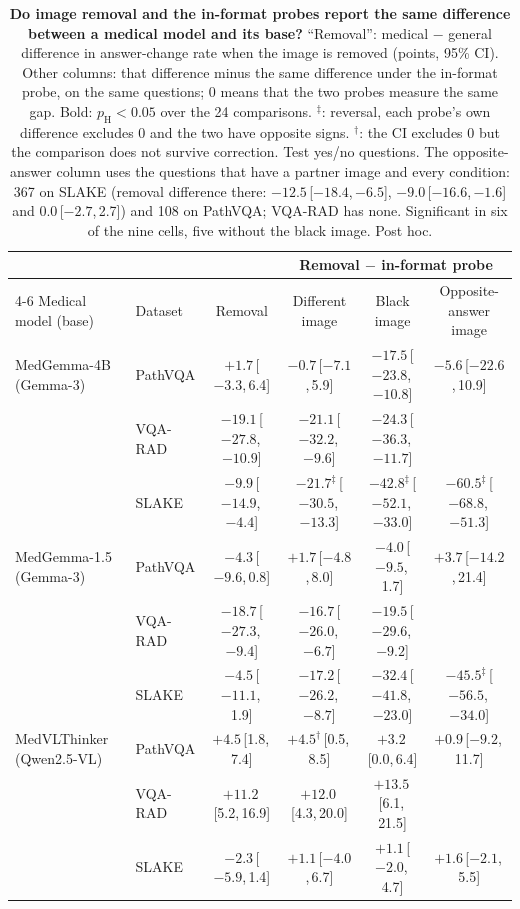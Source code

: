 \documentclass[10pt,twocolumn,letterpaper]{article}
\newcommand{\ci}[2]{\,[#1,\,#2]}  %
\begin{document}
\begin{table}[t]
\centering\footnotesize\setlength{\tabcolsep}{3.5pt}
\caption{\textbf{Do image removal and the in-format probes report the same difference between a medical model and
its base?} ``Removal'': medical $-$ general difference in answer-change rate when the image is removed (points,
95\% CI). Other columns: that difference minus the same difference under the in-format probe, on the same
questions; 0 means that the two probes measure the same gap. Bold: $p_{\text{H}}<0.05$ over the 24
comparisons. $^\ddagger$: reversal, \ie each probe's own difference excludes 0 and the two have opposite signs.
$^\dagger$: the CI excludes 0 but the comparison does not survive correction. Test yes/no questions. The
opposite-answer column uses the questions that have a partner image and every condition: 367 on SLAKE (removal
difference there: $-12.5$\ci{$-18.4$}{$-6.5$}, $-9.0$\ci{$-16.6$}{$-1.6$} and $0.0$\ci{$-2.7$}{2.7}) and 108 on
PathVQA; VQA-RAD has none. Significant in six of the nine cells, five without the black image. Post hoc.}
\label{tab:did}
\begin{tabular}{llcccc}
\toprule
& & & \multicolumn{3}{c}{Removal $-$ in-format probe}\\
\cmidrule(lr){4-6}
Medical model (base) & Dataset & Removal & Different image & Black image & Opposite-answer image\\
\midrule
MedGemma-4B (Gemma-3) & PathVQA & $+1.7$\ci{$-3.3$}{6.4} & $-0.7$\ci{$-7.1$}{5.9} & $\mathbf{-17.5}$\ci{$-23.8$}{$-10.8$} & $-5.6$\ci{$-22.6$}{10.9}\\
& VQA-RAD & $-19.1$\ci{$-27.8$}{$-10.9$} & $\mathbf{-21.1}$\ci{$-32.2$}{$-9.6$} & $\mathbf{-24.3}$\ci{$-36.3$}{$-11.7$} & \\
& SLAKE & $-9.9$\ci{$-14.9$}{$-4.4$} & $\mathbf{-21.7}^\ddagger$\ci{$-30.5$}{$-13.3$} & $\mathbf{-42.8}^\ddagger$\ci{$-52.1$}{$-33.0$} & $\mathbf{-60.5}^\ddagger$\ci{$-68.8$}{$-51.3$}\\
\midrule
MedGemma-1.5 (Gemma-3) & PathVQA & $-4.3$\ci{$-9.6$}{0.8} & $+1.7$\ci{$-4.8$}{8.0} & $-4.0$\ci{$-9.5$}{1.7} & $+3.7$\ci{$-14.2$}{21.4}\\
& VQA-RAD & $-18.7$\ci{$-27.3$}{$-9.4$} & $\mathbf{-16.7}$\ci{$-26.0$}{$-6.7$} & $\mathbf{-19.5}$\ci{$-29.6$}{$-9.2$} & \\
& SLAKE & $-4.5$\ci{$-11.1$}{1.9} & $\mathbf{-17.2}$\ci{$-26.2$}{$-8.7$} & $\mathbf{-32.4}$\ci{$-41.8$}{$-23.0$} & $\mathbf{-45.5}^\ddagger$\ci{$-56.5$}{$-34.0$}\\
\midrule
MedVLThinker (Qwen2.5-VL) & PathVQA & $+4.5$\ci{1.8}{7.4} & $+4.5^\dagger$\ci{0.5}{8.5} & $+3.2$\ci{0.0}{6.4} & $+0.9$\ci{$-9.2$}{11.7}\\
& VQA-RAD & $+11.2$\ci{5.2}{16.9} & $\mathbf{+12.0}$\ci{4.3}{20.0} & $\mathbf{+13.5}$\ci{6.1}{21.5} & \\
& SLAKE & $-2.3$\ci{$-5.9$}{1.4} & $+1.1$\ci{$-4.0$}{6.7} & $+1.1$\ci{$-2.0$}{4.7} & $+1.6$\ci{$-2.1$}{5.5}\\
\bottomrule
\end{tabular}
\end{table}
\end{document}
